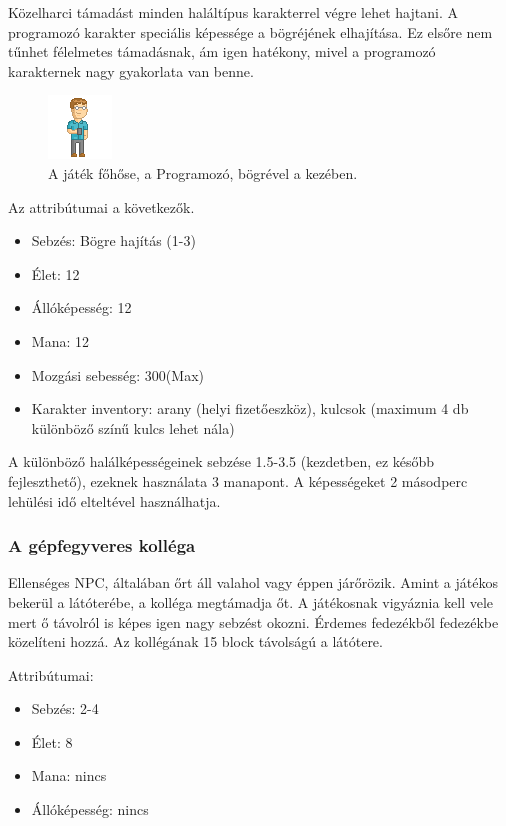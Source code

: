 \documentclass[a4paper]{article}
\begin{document}
Közelharci támadást minden haláltípus karakterrel végre lehet hajtani.
A programozó karakter speciális képessége a bögréjének elhajítása.
Ez elsőre nem tűnhet félelmetes támadásnak, ám igen hatékony, mivel a programozó karakternek nagy gyakorlata van benne.

\begin{figure}[h!]
\centering
\includegraphics[scale=3]{images/programmer.png}
\caption{A játék főhőse, a Programozó, bögrével a kezében.}
\label{fig:programmer}
\end{figure}

Az attribútumai a következők.
\begin{itemize}
\item Sebzés: Bögre hajítás (1-3)
\item Élet: 12
\item Állóképesség: 12
\item Mana: 12
\item Mozgási sebesség: 300(Max)
\item Karakter inventory: arany (helyi fizetőeszköz), kulcsok (maximum 4 db különböző színű kulcs lehet nála)
\end{itemize}

A különböző halálképességeinek sebzése 1.5-3.5 (kezdetben, ez később fejleszthető), ezeknek használata 3 manapont.
A képességeket 2 másodperc lehülési idő elteltével használhatja.

\subsubsection{A gépfegyveres kolléga}

Ellenséges NPC, általában őrt áll valahol vagy éppen járőrözik.
Amint a játékos bekerül a látóterébe, a kolléga megtámadja őt.
A játékosnak vigyáznia kell vele mert ő távolról is képes igen nagy sebzést okozni. Érdemes fedezékből fedezékbe közelíteni hozzá.
Az kollégának 15 block távolságú a látótere.

Attribútumai:
\begin{itemize}
\item Sebzés: 2-4
\item Élet: 8
\item Mana: nincs
\item Állóképesség: nincs
\end{itemize}
\end{document}
